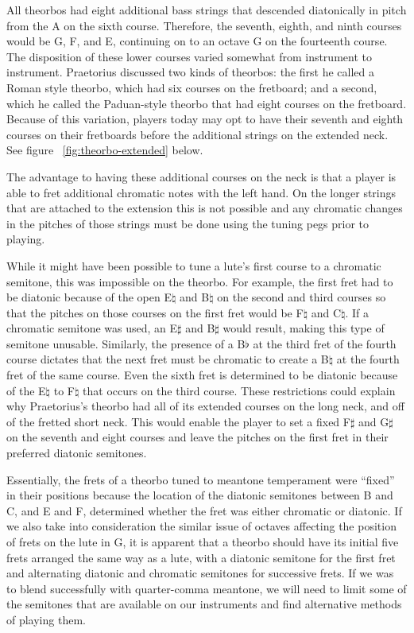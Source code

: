 All theorbos had eight additional bass strings that descended diatonically in
pitch from the A on the sixth course. Therefore, the seventh, eighth, and ninth
courses would be G, F, and E, continuing on to an octave G on the fourteenth
course. The disposition of these lower courses varied somewhat from instrument
to instrument. Praetorius discussed two kinds of theorbos: the first he called
a Roman style theorbo, which had six courses on the fretboard; and a second,
which he called the Paduan-style theorbo that had eight courses on the
fretboard. \autocite[59]{MP:1} Because of this variation, players today may
opt to have their seventh and eighth courses on their fretboards before the
additional strings on the extended neck. See figure ~\ref{fig:theorbo-extended}
below.

The advantage to having these additional courses on the neck is that a player is
able to fret additional chromatic notes with the left hand. On the longer
strings that are attached to the extension this is not possible and any
chromatic changes in the pitches of those strings must be done using the tuning
pegs prior to playing.

While it might have been possible to tune a lute's first course to a chromatic semitone, this was impossible on the
theorbo. For example, the first fret had to be diatonic because of the open E$\natural$ and B$\natural$ on the second
and third courses so that the pitches on those courses on the first fret would be F$\natural$ and C$\natural$. If a
chromatic semitone was used, an E$\sharp$ and B$\sharp$ would result, making this type of semitone unusable. Similarly,
the presence of a B$\flat$ at the third fret of the fourth course dictates that the next fret must be chromatic to
create a B$\natural$ at the fourth fret of the same course. Even the sixth fret is determined to be diatonic because of
the E$\natural$ to F$\natural$ that occurs on the third course. These restrictions could explain why Praetorius's
theorbo had all of its extended courses on the long neck, and off of the fretted short neck. This would enable the
player to set a fixed F$\sharp$ and G$\sharp$ on the seventh and eight courses and leave the pitches on the first fret
in their preferred diatonic semitones.

Essentially, the frets of a theorbo tuned to meantone temperament were ``fixed'' in their positions because the location
of the diatonic semitones between B and C, and E and F, determined whether the fret was either chromatic or diatonic. If
we also take into consideration the similar issue of octaves affecting the position of frets on the lute in G, it is
apparent that a theorbo should have its initial five frets arranged the same way as a lute, with a diatonic semitone for
the first fret and alternating diatonic and chromatic semitones for successive frets. If we was to blend successfully
with quarter-comma meantone, we will need to limit some of the semitones that are available on our instruments and find
alternative methods of playing them.

